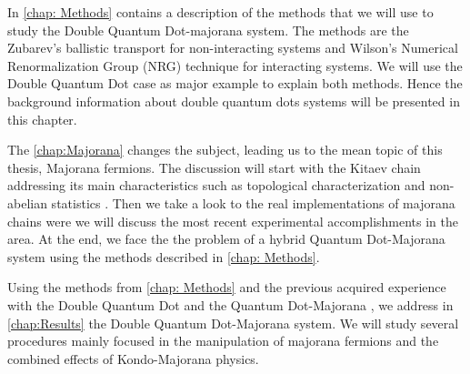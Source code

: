 In \ref{chap: Methods} contains a description of the methods that we will use to study the Double Quantum Dot-majorana system. The  methods  are the Zubarev's ballistic transport\cite{zubarev_double-time_1960} for non-interacting systems and Wilson's Numerical Renormalization
Group (NRG) technique \citep{wilson_renormalization_1975} for interacting systems. We will use the Double Quantum Dot case as major example to explain both methods. Hence the background information about double quantum dots systems will be presented in this chapter. 

The \ref{chap:Majorana} changes the subject, leading us to the mean topic of this thesis, Majorana fermions. The discussion will start with the Kitaev chain addressing its main characteristics such as topological characterization and non-abelian statistics . Then we take a look to the real implementations of majorana chains were we will discuss the most recent experimental accomplishments  in the area.  At the end, we face the the problem of a hybrid Quantum Dot-Majorana system using the methods described in \ref{chap: Methods}.

Using the methods from \ref{chap: Methods} and the previous acquired experience with the Double Quantum Dot and the Quantum Dot-Majorana , we address in \ref{chap:Results} the  Double Quantum Dot-Majorana system. We will study several procedures  mainly focused in the manipulation of majorana fermions and the combined effects of Kondo-Majorana physics. 







